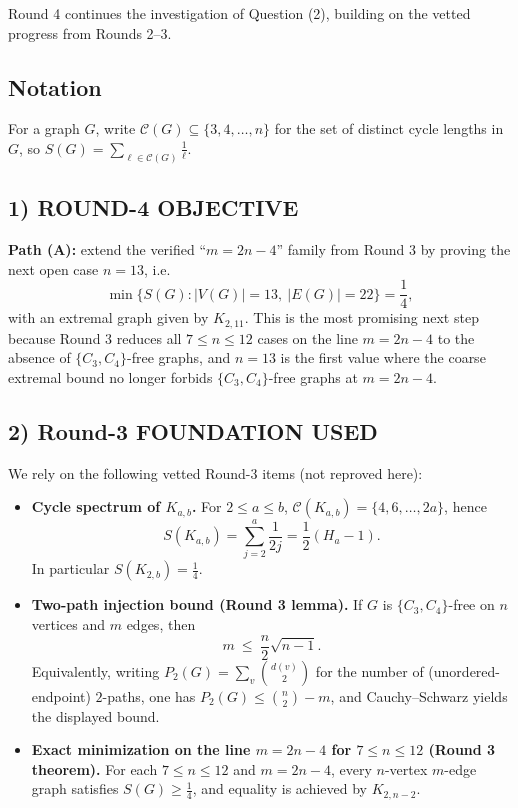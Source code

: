 Round 4 continues the investigation of Question (2), building on the vetted progress from Rounds 2--3.

\subsection*{Notation}
For a graph $G$, write $\mathcal C(G)\subseteq\{3,4,\dots,n\}$ for the set of distinct cycle lengths in $G$, so $S(G)=\sum_{\ell\in\mathcal C(G)}\frac1\ell$.

\subsection*{1) ROUND-4 OBJECTIVE}
\textbf{Path (A):} extend the verified ``$m=2n-4$'' family from Round 3 by proving the next open case $n=13$, i.e.
\[
\min\{S(G): |V(G)|=13,\ |E(G)|=22\}=\frac14,
\]
with an extremal graph given by $K_{2,11}$.
This is the most promising next step because Round 3 reduces all $7\le n\le 12$ cases on the line $m=2n-4$ to the absence of $\{C_3,C_4\}$-free graphs, and $n=13$ is the first value where the coarse extremal bound no longer forbids $\{C_3,C_4\}$-free graphs at $m=2n-4$.

\subsection*{2) Round-3 FOUNDATION USED}
We rely on the following vetted Round-3 items (not reproved here):
\begin{itemize}
\item[(F1)] \textbf{Cycle spectrum of $K_{a,b}$.} For $2\le a\le b$, $\mathcal C(K_{a,b})=\{4,6,\dots,2a\}$, hence
\[
S(K_{a,b})=\sum_{j=2}^a\frac1{2j}=\frac12(H_a-1).
\]
In particular $S(K_{2,b})=\frac14$.
\item[(F2)] \textbf{Two-path injection bound (Round 3 lemma).} If $G$ is $\{C_3,C_4\}$-free on $n$ vertices and $m$ edges, then
\[
m\ \le\ \frac n2\sqrt{n-1}.
\]
Equivalently, writing $P_2(G)=\sum_{v}\binom{d(v)}2$ for the number of (unordered-endpoint) $2$-paths, one has
$P_2(G)\le \binom n2-m$, and Cauchy--Schwarz yields the displayed bound.
\item[(F3)] \textbf{Exact minimization on the line $m=2n-4$ for $7\le n\le 12$ (Round 3 theorem).}
For each $7\le n\le 12$ and $m=2n-4$, every $n$-vertex $m$-edge graph satisfies $S(G)\ge \frac14$, and equality is achieved by $K_{2,n-2}$.
\end{itemize}

